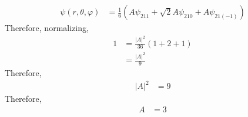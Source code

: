 \documentclass[fleqn, a4paper, 11pt, oneside]{amsart}
\theoremstyle{definition}
\theoremstyle{theorem}
\begin{document}
\begin{solution}
\begin{enumerate}[leftmargin=*]
\begin{align*}
				\psi(r,\theta,\varphi) & = \frac{1}{6} \left( A \psi_{2 1 1} + \sqrt{2} A \psi_{2 1 0} + A \psi_{2 1 (-1)} \right)
			\end{align*}
			Therefore, normalizing,
			\begin{align*}
				1 & = \frac{|A|^2}{36} (1 + 2 + 1) \\
                                  & = \frac{|A|^2}{9}
			\end{align*}
			Therefore,
			\begin{align*}
				|A|^2 & = 9
			\end{align*}
			Therefore,
			\begin{align*}
				A & = 3
			\end{align*}
	\end{enumerate}
\end{solution}
\end{document}
